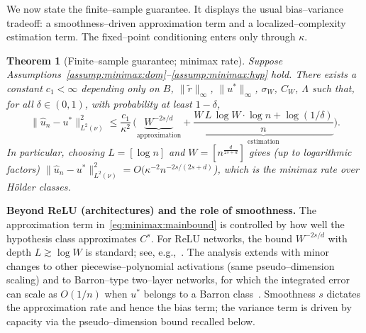 \documentclass[pdflatex,sn-mathphys-ay]{sn-jnl}%
\numberwithin{equation}{section}
\theoremstyle{thmstyleone}%
\newtheorem{theorem}{Theorem}%
\theoremstyle{thmstyletwo}%
\theoremstyle{thmstylethree}%
\begin{document}
We now state the finite–sample guarantee.  It displays the usual bias–variance tradeoff: a smoothness–driven approximation term and a localized–complexity estimation term.  The fixed–point conditioning enters only through \(\kappa\).

\begin{theorem}[Finite–sample guarantee; minimax rate]\label{thm:minimax:main}
Suppose Assumptions~\ref{assump:minimax:dom}--\ref{assump:minimax:hyp} hold.  There exists a constant \(c_1<\infty\) depending only on \(B\), \(\|\tilde{r}\|_\infty\), $\|u^*\|_\infty$, $\sigma_W$, $C_W$, \(\Lambda\) such that, for all \(\delta\in(0,1)\), with probability at least \(1-\delta\),
\begin{equation}\label{eq:minimax:mainbound}
\| \hat u_n - u^*\|_{L^2(\nu)}^2
\le \frac{c_1}{\kappa^2}\,\Bigg(\underbrace{W^{-2s/d}}_{\text{approximation}} + \underbrace{\frac{W\,L\,\log W\cdot \log n + \log(1/\delta)}{n}}_{\text{estimation}}\Bigg).
\end{equation}
In particular, choosing \(L = [\log n]\) and \(W = [n^{\frac{d}{2s+d}}]\) gives (up to logarithmic factors)
\(\| \hat u_n - u^*\|_{L^2(\nu)}^2 = O(\kappa^{-2} n^{-2s/(2s+d)}\)), which is the minimax rate over H\"older classes.
\end{theorem}

\textbf{Beyond ReLU (architectures) and the role of smoothness.}
The approximation term in~\eqref{eq:minimax:mainbound} is controlled by how well the hypothesis class approximates \(C^s\).  For ReLU networks, the bound \(W^{-2s/d}\) with depth \(L\gtrsim \log W\) is standard; see, e.g.,~\cite{yarotsky2017error,yarotsky2018optimal,suzuki2018adaptivity,siegel2023optimal,Mhaskar1996}.  The analysis extends with minor changes to other piecewise–polynomial activations (same pseudo–dimension scaling) and to Barron–type two–layer networks, for which the integrated error can scale as \(O(1/n)\) when \(u^*\) belongs to a Barron class~\cite{Barron1993}.  Smoothness \(s\) dictates the approximation rate and hence the bias term; the variance term is driven by capacity via the pseudo–dimension bound recalled below.
\end{document}
